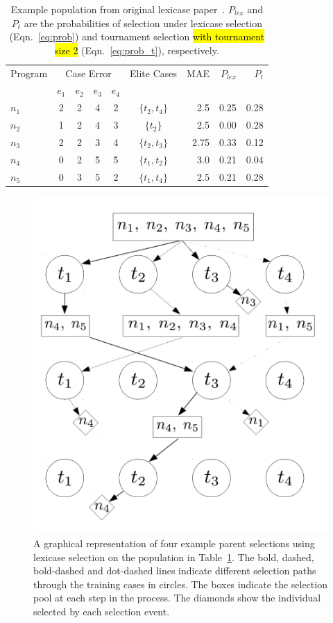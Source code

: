 \documentclass[twoside]{article}
\begin{document}
\begin{table}
\centering
\caption{Example population from original lexicase paper~\citep{spector_assessment_2012}. $P_{lex}$ and $P_t$ are the probabilities of selection under lexicase selection (Eqn.~\ref{eq:prob}) and tournament selection \hl{with tournament size 2} (Eqn.~\ref{eq:prob_t}), respectively.}\label{tbl:ex}
\begin{tabular}{l|cccc|c|r|rr}\toprule
Program & \multicolumn{4}{c}{Case Error} & Elite Cases & MAE & $P_{lex}$ & $P_{t}$\\
& $e_1$ & $e_2$ & $e_3$ & $e_4$ & \\ \midrule
$n_1$ & 2 & 2 & 4 & 2 & $\{t_2,t_4\}$ &	2.5		&	0.25 	& 	0.28	\\
$n_2$ & 1 & 2 & 4 & 3 & $\{t_2\}$		&	2.5		&	0.00	&	0.28	\\
$n_3$ & 2 & 2 & 3 & 4 & $\{t_2,t_3\}$ &	2.75	& 	0.33	&	0.12	\\
$n_4$ & 0 & 2 & 5 & 5 & $\{t_1,t_2\}$ &	3.0		& 	0.21	&	0.04	\\
$n_5$ & 0 & 3 & 5 & 2 & $\{t_1,t_4\}$ &	2.5		&	0.21	&	0.28	\\ \bottomrule
\end{tabular}
\end{table}


\begin{figure}[tb]
\centering
  \includegraphics[height = 0.3\textheight]{figs/lex_graph.pdf}
  \caption{A graphical representation of four example parent selections using lexicase selection on the population in Table~\ref{tbl:ex}. The bold, dashed, bold-dashed and dot-dashed lines indicate different selection paths through the training cases in circles. The boxes indicate the selection pool at each step in the process. The diamonds show the individual selected by each selection event.}\label{fig:lex_graph}
\end{figure}
\end{document}
